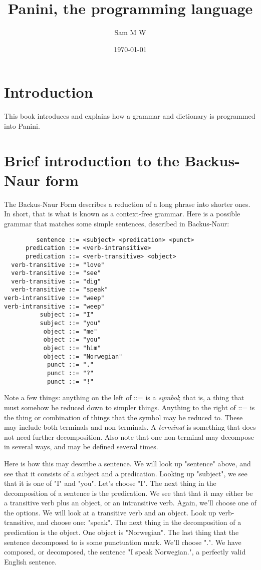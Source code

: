 \documentclass{article}
\title{Panini, the programming language}
\author{Sam M W}
\date{\today}
\begin{document}
\label{start}

\maketitle

\section{Introduction}

This book introduces and explains how a grammar and dictionary is programmed into Panini.

\section{Brief introduction to the Backus-Naur form}
The Backus-Naur Form describes a reduction of a long phrase into shorter ones. In short, that is what is known as a context-free 
grammar. Here is a possible grammar that matches some simple sentences, described in Backus-Naur:

\begin{lstlisting}
         sentence ::= <subject> <predication> <punct>
      predication ::= <verb-intransitive>
      predication ::= <verb-transitive> <object>
  verb-transitive ::= "love"
  verb-transitive ::= "see"
  verb-transitive ::= "dig"
  verb-transitive ::= "speak"
verb-intransitive ::= "weep" 
verb-intransitive ::= "weep" 
          subject ::= "I"
          subject ::= "you"
           object ::= "me"
           object ::= "you"
           object ::= "him"
           object ::= "Norwegian"
            punct ::= "." 
            punct ::= "?"
            punct ::= "!"
\end{lstlisting}
Note a few things: anything on the left of ::= is a \emph{symbol}; that is, a thing that must somehow be reduced down to simpler 
things. Anything to the right of ::= is the thing or combination of things that the symbol may be reduced to. These may include both
terminals and non-terminals. A \emph{terminal} is something that does not need further decomposition. Also note that one
non-terminal may decompose in several ways, and may be defined several times.

Here is how this may describe a sentence. We will look up "sentence" above, and see that it consists of a subject and a predication.
Looking up "subject", we see that it is one of "I" and "you". Let's choose "I". The next thing in the decomposition of a sentence is
the predication. We see that that it may either be a transitive verb plus an object, or an intransitive verb. Again, we'll choose 
one of the options. We will look at a transitive verb and an object. Look up verb-transitive, and choose one: "speak". The next 
thing in the decomposition of a predication is the object. One object is "Norwegian". The last thing that the sentence decomposed to
is some punctuation mark. We'll choose ".". We have composed, or decomposed, the sentence "I speak Norwegian.", a perfectly valid 
English sentence.
\end{document}
